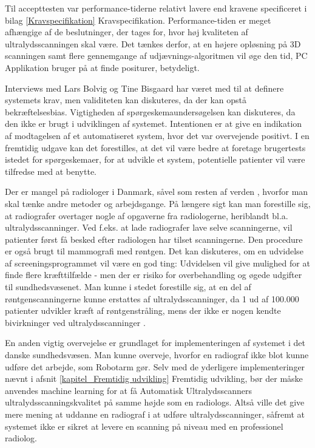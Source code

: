Til accepttesten var performance-tiderne relativt lavere end kravene specificeret i bilag \ref{Kravspecifikation} Kravspecifikation. Performance-tiden er meget afhængige af de beslutninger, der tages for, hvor høj kvaliteten af ultralydsscanningen skal være. Det tænkes derfor, at en højere opløsning på 3D scanningen samt flere gennemgange af udjævnings-algoritmen vil øge den tid, PC Applikation bruger på at finde positurer, betydeligt.  

Interviews med Lars Bolvig og Tine Bisgaard har været med til at definere systemets krav, men validiteten kan diskuteres, da der kan opstå bekræftelsesbias.  Vigtigheden af spørgeskemaundersøgelsen kan diskuteres, da den ikke er brugt i udviklingen af systemet. Intentionen er at give en indikation af modtagelsen af et automatiseret system, hvor det var overvejende positivt. I en fremtidig udgave kan det forestilles, at det vil være bedre at foretage brugertests istedet for spørgeskemaer, for at udvikle et system, potentielle patienter vil være tilfredse med at benytte. 

Der er mangel på radiologer i Danmark, såvel som resten af verden \cite{Lagemangel}, hvorfor man skal tænke andre metoder og arbejdsgange. På længere sigt kan man forestille sig, at radiografer overtager nogle af opgaverne fra radiologerne, heriblandt bl.a. ultralydsscanninger. Ved f.eks. at lade radiografer lave selve scanningerne, vil patienter først få besked efter radiologen har tilset scanningerne. Den procedure er også brugt til mammografi med røntgen. Det kan diskuteres, om en udvidelse af screeningsprogrammet vil være en god ting: Udvidelsen vil give mulighed for at finde flere kræfttilfælde - men der er risiko for overbehandling og øgede udgifter til sundhedsvæsenet. Man kunne i stedet forestille sig, at en del af røntgenscanningerne kunne erstattes af ultralydsscanninger, da 1 ud af 100.000 \cite{Risk} patienter udvikler kræft af røntgenstråling, mens der ikke er nogen kendte bivirkninger ved ultralydsscanninger \cite{Ultralydsscanning}. 

 En anden vigtig overvejelse er grundlaget for implementeringen af systemet i det danske sundhedsvæsen. Man kunne overveje, hvorfor en radiograf ikke blot kunne udføre det arbejde, som Robotarm gør. Selv med de yderligere implementeringer nævnt i afsnit \ref{kapitel_Fremtidig udvikling} Fremtidig udvikling, bør der måske anvendes machine learning for at få Automatisk Ultralydsscanners ultralydsscanningskvalitet på samme højde som en radiologs. Altså ville det give mere mening at uddanne en radiograf i at udføre ultralydsscanninger, såfremt at systemet ikke er sikret at levere en scanning på niveau med en professionel radiolog.

